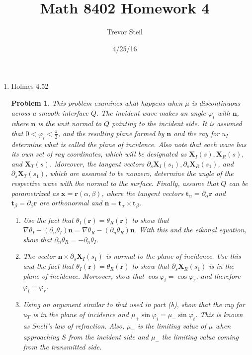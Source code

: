 \documentclass[a4paper]{article}
\title{Math 8402 Homework 4 }
\date{4/25/16}
\author{Trevor Steil}
\newtheorem*{problem}{Problem}
\begin{document}
\maketitle
\begin{enumerate}
  \item Holmes 4.52
    \begin{problem}
      This problem examines what happens when $\mu$ is discontinuous across a smooth interface $Q$. The incident wave makes an angle $\varphi_i$ with
      $\mathbf{n}$, where $\mathbf{n}$ is the unit normal to $Q$ pointing to the incident side. It is assumed that $0 < \varphi_i <
      \frac{\pi}{2}$, and the resulting plane formed by $\mathbf{n}$ and the ray for $u_I$ determine what is called the plane of incidence. Also note
      that each wave has its own set of ray coordinates, which will be designated as $\mathbf{X}_I(s), \mathbf{X}_R(s),$ and $\mathbf{X}_T(s)$.
      Moreover, the tangent vectors $\partial_s \mathbf{X}_I(s_1), \partial_s \mathbf{X}_R(s_1)$, and $\partial_s \mathbf{X}_T(s_1)$, which are
      assumed to be nonzero, determine the angle of the respective wave with the normal to the surface. Finally, assume that $Q$ can be parametrized
      as $\mathbf{x} = \mathbf{r}(\alpha,\beta)$, where the tangent vectors $\mathbf{t}_\alpha = \partial_\alpha \mathbf{r}$ and $\mathbf{t}_\beta =
      \partial_\beta \mathbf{r}$ are orthonormal and $\mathbf{n} = \mathbf{t}_\alpha \times \mathbf{t}_\beta$.

      \begin{enumerate}
        \item Use the fact that $\theta_I(\mathbf{r}) = \theta_R(\mathbf{r})$ to show that $\nabla \theta_I - (\partial_n \theta_I) \mathbf{n} =
          \nabla \theta_R - (\partial_n \theta_R) \mathbf{n}$. With this and the eikonal equation, show that $\partial_n \theta_R = -\partial_n
          \theta_I$.

        \item The vector $\mathbf{n} \times \partial_s \mathbf{X}_I(s_1)$ is normal to the plane of incidence. Use this and the fact that
          $\theta_I(\mathbf{r}) = \theta_R(\mathbf{r})$ to show that $\partial_s \mathbf{X}_R(s_1)$ is in the plane of incidence. Moreover, show that
          $\cos \varphi_i = \cos \varphi_r$, and therefore $\varphi_i = \varphi_r$.

        \item Using an argument similar to that used in part (b), show that the ray for $u_T$ is in the plane of incidence and $\mu_+ \sin \varphi_i =
          \mu_- \sin \varphi_t$. This is known as Snell's law of refraction. Also, $\mu_+$ is the limiting value of $\mu$ when approaching $S$ from
          the incident side and $\mu_-$ the limiting value coming from the transmitted side.


\end{enumerate}
\end{problem}
\end{enumerate}
\end{document}
